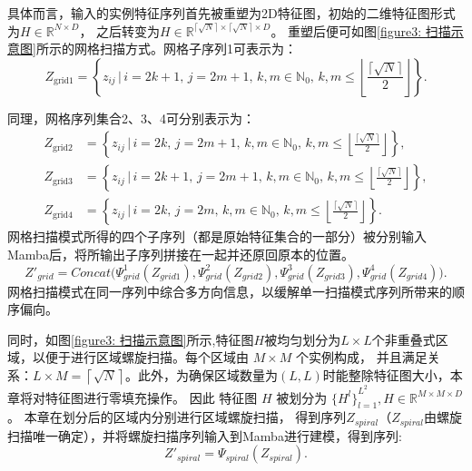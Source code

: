 具体而言，输入的实例特征序列首先被重塑为2D特征图，初始的二维特征图形式为$H\in \mathbb{R} ^{N\times D}$，
之后转变为$ H \in \mathbb{R} ^{\lceil\sqrt{N}\rceil \times \lceil\sqrt{N}\rceil \times D}$。
重塑后便可如图\ref{figure3: 扫描示意图}所示的网格扫描方式。网格子序列1可表示为：
\begin{equation}
  Z_{\text{grid1}} = \left\{ z_{ij} \,\big|\, 
i = 2k + 1,\, j = 2m + 1,\, 
k, m \in \mathbb{N}_0,\, 
k, m \leq \left\lfloor \frac{\lceil \sqrt{N} \rceil}{2} \right\rfloor 
\right\}.
\label{Z_grid1}
\end{equation}

同理，网格序列集合2、3、4可分别表示为：
\begin{equation}
  \begin{aligned}
  Z_{\text{grid2}} &= \left\{ z_{ij} \,\big|\, 
  i = 2k,\, j = 2m + 1,\, 
  k, m \in \mathbb{N}_0,\, 
  k, m \leq \left\lfloor \frac{\lceil \sqrt{N} \rceil}{2} \right\rfloor 
  \right\}, \\
  Z_{\text{grid3}} &= \left\{ z_{ij} \,\big|\, 
  i = 2k + 1,\, j = 2m + 1,\, 
  k, m \in \mathbb{N}_0,\, 
  k, m \leq \left\lfloor \frac{\lceil \sqrt{N} \rceil}{2} \right\rfloor 
  \right\}, \\
  Z_{\text{grid4}} &= \left\{ z_{ij} \,\big|\, 
  i = 2k,\, j = 2m,\, 
  k, m \in \mathbb{N}_0,\, 
  k, m \leq \left\lfloor \frac{\lceil \sqrt{N} \rceil}{2} \right\rfloor 
  \right\}.
  \end{aligned}
  \label{Z_grid234}
\end{equation}
网格扫描模式所得的四个子序列（都是原始特征集合的一部分）被分别输入Mamba后，将所输出子序列拼接在一起并还原回原本的位置。
\begin{equation}
  Z'_{grid}=Concat({\Psi^1_{grid} (Z_{grid1})},{\Psi^2_{grid} (Z_{grid2})},{\Psi^3_{grid} (Z_{grid3})},{\Psi^4_{grid} (Z_{grid4}))}.
\end{equation}
网格扫描模式在同一序列中综合多方向信息，以缓解单一扫描模式序列所带来的顺序偏向。

同时，如图\ref{figure3: 扫描示意图}所示,特征图$H$被均匀划分为$L\times L$个非重叠式区域，以便于进行区域螺旋扫描。每个区域由 $M\times M$ 个实例构成，
并且满足关系：$L \times M=\left\lceil\sqrt{N}\right\rceil$。此外，为确保区域数量为$(L,L)$时能整除特征图大小，本章将对特征图进行零填充操作。
因此 特征图 $H$ 被划分为 ${\{H^l\}}^{L^2}_{l=1},H \in \mathbb{R} ^{M\times M\times D}$。
本章在划分后的区域内分别进行区域螺旋扫描，
得到序列$Z_{spiral}$（$Z_{spiral}$由螺旋扫描唯一确定），并将螺旋扫描序列输入到Mamba进行建模，得到序列:
\begin{equation}
  Z'_{spiral}=\Psi_{spiral} (Z_{spiral}).
\end{equation}

